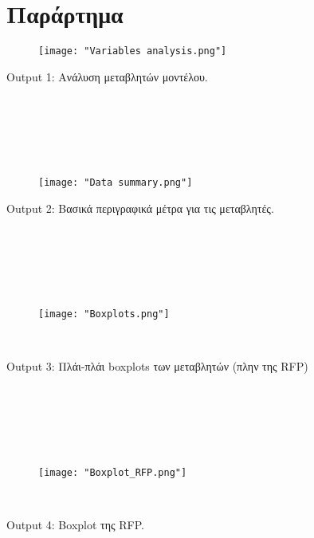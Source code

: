 \documentclass[10pt]{article}
\begin{document}
\

\

\ 

\section{ Παράρτημα}

\begin{figure}[H]
    \centering
    \texttt{[image: "Variables analysis.png"]}
    
    \label{fig:galaxy}
\end{figure}

\renewcommand{\caption}{Output 1: }
\caption { Ανάλυση μεταβλητών μοντέλου. }

\

\

\


\begin{figure}[H]
    \centering
    \texttt{[image: "Data summary.png"]}
    
    \label{fig:galaxy}
\end{figure}

\renewcommand{\caption}{Output 2: }
\caption { Βασικά περιγραφικά μέτρα για τις μεταβλητές. }

\

\

\


\begin{centering}

 \begin{figure}[H]
    \centering
    \texttt{[image: "Boxplots.png"]}
    
    \label{fig:galaxy}
\end{figure}
\

\renewcommand{\caption}{Output 3: }
\caption{Πλάι-πλάι boxplots των μεταβλητών (πλην της RFP)}
\end{centering}

\

\

\

 \begin{figure}[H]
    \centering
    \texttt{[image: "Boxplot\_RFP.png"]}
    
    \label{fig:galaxy}
\end{figure}
\

\begin{centering}


\renewcommand{\caption}{Output 4: }
\caption{Boxplot της RFP.}
\end{centering}
\end{document}
